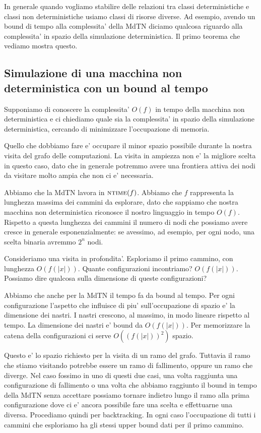 
In generale quando vogliamo stabilire delle relazioni tra classi deterministiche e classi non
deterministiche usiamo classi di risorse diverse. Ad esempio, avendo un bound di tempo alla
complessita' della MdTN diciamo qualcosa riguardo alla complessita' in spazio della simulazione
deterministica. Il primo teorema che vediamo mostra questo.

\subsection{Simulazione di una macchina non deterministica con un bound al tempo}

Supponiamo di conoscere la complessita' $O(f)$ in tempo della macchina non deterministica e ci
chiediamo quale sia la complessita' in spazio della simulazione deterministica, cercando di
minimizzare l'occupazione di memoria.

Quello che dobbiamo fare e' occupare il minor spazio possibile durante la nostra visita del grafo
delle computazioni. La visita in ampiezza non e' la migliore scelta in questo caso, dato che in
generale potremmo avere una frontiera attiva dei nodi da visitare molto ampia che non ci e'
necessaria.

Abbiamo che la MdTN lavora in $\textsc{ntime}(f)$. Abbiamo che $f$ rappresenta la lunghezza massima dei
cammini da esplorare, dato che sappiamo che nostra macchina non deterministica riconosce il nostro
linguaggio in tempo $O(f)$. Rispetto a questa lunghezza dei cammini il numero di nodi che possiamo
avere cresce in generale esponenzialmente: se avessimo, ad esempio, per ogni nodo, una scelta
binaria avremmo $2^{n}$ nodi.

Consideriamo una visita in profondita'. Esploriamo il primo cammino, con lunghezza $O(f(|x|))$.
Quante configurazioni incontriamo? $O(f(|x|))$. Possiamo dire qualcosa sulla dimensione di queste
configurazioni? 

Abbiamo che anche per la MdTN il tempo fa da bound al tempo. Per ogni configurazione l'aspetto che
influisce di piu' sull'occupazione di spazio e' la dimensione dei nastri. I nastri crescono, al
massimo, in modo lineare rispetto al tempo. La dimensione dei nastri e' bound da $O(f(|x|))$. Per
memorizzare la catena della configurazioni ci serve $O((f(|x|))^{2})$ spazio. 

Questo e' lo spazio richiesto per la visita di un ramo del grafo. Tuttavia il ramo che stiamo
visitando potrebbe essere un ramo di fallimento, oppure un ramo che diverge. Nel caso fossimo in uno
di questi due casi, una volta raggiunta una configurazione di fallimento o una volta che abbiamo
raggiunto il bound in tempo della MdTN senza accettare possiamo tornare indietro lungo il ramo alla
prima configurazione dove ci e' ancora possibile fare una scelta e effettuarne una diversa.
Procediamo quindi per backtracking. In ogni caso l'occupazione di tutti i cammini che esploriamo ha
gli stessi upper bound dati per il primo cammino.

